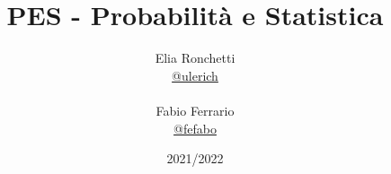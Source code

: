 \documentclass[12pt, a4paper, openany]{book}
\begin{document}
\title{PES - Probabilità e Statistica}

\author{
	Elia Ronchetti\\
	\small{\href{https://t.me/ulerich}{@ulerich}}
	\\\\Fabio Ferrario\\
	\small{\href{https://t.me/fefabo}{@fefabo}}
}

\date{2021/2022}

\maketitle

\tableofcontents














\end{document}
